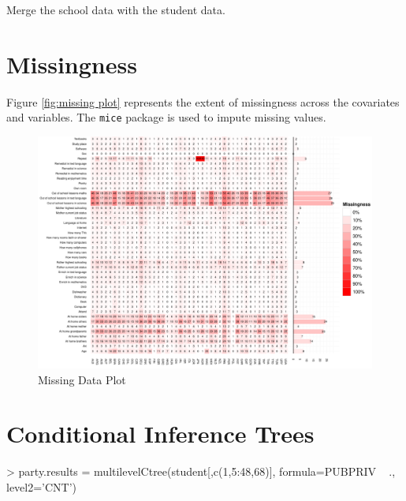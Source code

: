 \documentclass[nojss]{jss}
\begin{document}
Merge the school data with the student data.

\begin{Schunk}
\end{Schunk}

\section{Missingness}

Figure \ref{fig:missing plot} represents the extent of missingness across the covariates and variables. The \texttt{mice} package is used to impute missing values.

\begin{figure}[tp]
\begin{center}
\includegraphics[width=\textwidth]{figures/MissingPlot.pdf}
\caption{Missing Data Plot}
\label{fig:missingplot}
\end{center}
\end{figure}


\section{Conditional Inference Trees}


\begin{Schunk}
\begin{Sinput}
> party.results = multilevelCtree(student[,c(1,5:48,68)], formula=PUBPRIV ~ ., level2='CNT')
\end{Sinput}
\end{Schunk}
\end{document}
